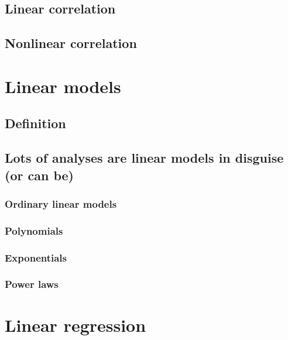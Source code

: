 \documentclass[
  13,
  letterpaper,
]{report}
\begin{document}
\subsection{Linear correlation}\label{sec-lin-cor-lin}

\subsection{Nonlinear correlation}\label{sec-lin-cor-non}

\section{Linear models}\label{sec-lin-lm}

\subsection{Definition}\label{sec-lin-lm-def}

\subsection{Lots of analyses are linear models in disguise (or can
be)}\label{sec-lin-lm-disguise}

\subsubsection{Ordinary linear models}\label{sec-lin-lm-disguise-lm}

\subsubsection{Polynomials}\label{sec-lin-lm-disguise-poly}

\subsubsection{Exponentials}\label{sec-lin-lm-disguise-exp}

\subsubsection{Power laws}\label{sec-lin-lm-disguise-pow}

\section{Linear regression}\label{sec-lin-reg}
\end{document}
